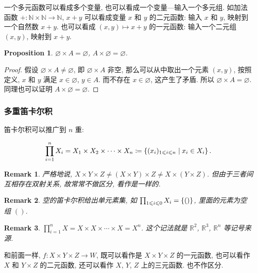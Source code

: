 \documentclass[UTF8]{ctexart}
\theoremstyle{mystyle}
\newtheorem{proposition}{Proposition}[section]
\theoremstyle{myremark}
\newtheorem*{remark}{Remark}
\theoremstyle{plain}
\newcommand{\R}{\mathbb R}
\newcommand{\N}{\mathbb N}
\DeclarePairedDelimiter\set{\{}{\}}
\begin{document}
一个多元函数可以看成多个变量, 也可以看成一个变量---输入一个多元组. 如加法函数 $ + \colon \N \times \N \to \N $, $ x + y $ 可以看成变量 $ x $ 和 $ y $ 的二元函数: 输入 $ x $ 和 $ y $, 映射到一个自然数 $ x + y $. 也可以看成 $ (x, y) \mapsto x + y $ 的一元函数: 输入一个二元组 $ (x, y) $, 映射到 $ x + y $.

\begin{proposition}
    $ \varnothing \times A = \varnothing $, $ A \times \varnothing = \varnothing $.
\end{proposition}

\begin{proof}
    假设 $ \varnothing \times A \neq \varnothing $, 即 $ \varnothing \times A $ 非空, 那么可以从中取出一个元素 $ (x, y) $, 按照定义, $ x $ 和 $ y $ 满足 $ x \in \varnothing $, $ y \in A $. 而不存在 $ x \in \varnothing $, 这产生了矛盾. 所以 $ \varnothing \times A = \varnothing $. 同理也可以证明 $ A \times \varnothing = \varnothing $.
\end{proof}


\subsubsection{多重笛卡尔积}
笛卡尔积可以推广到 $ n $ 重:
\begin{definition}
    \[ \prod_{i = 1}^n X_i = X_1 \times X_2 \times \cdots \times X_n \coloneqq \set{(x_i)_{1 \leqslant i \leqslant n} \mid x_i \in X_i } \,.\]
\end{definition}

\begin{remark}
    严格地说, $ X \times Y \times Z \neq (X \times Y) \times Z \neq X \times (Y \times Z) $. 但由于三者间互相存在双射关系, 故常常不做区分, 看作是一样的.
\end{remark}

\begin{remark}
    空的笛卡尔积给出单元素集, 如 $ \prod_{1 \leqslant i \leqslant 0} X_i = \set{()} $, 里面的元素为空组 $ () $. 
\end{remark}

\begin{remark}
    $ \prod_{i = 1}^n X = X \times X \times \cdots \times X = X^n $. 这个记法就是 $ \R^2 $, $ \R^3 $, $ \R^n $ 等记号来源.
\end{remark}

和前面一样, $ f \colon X \times Y \times Z \to W $, 既可以看作是 $ X \times Y \times Z $ 的一元函数, 也可以看作 $ X $ 和 $ Y \times Z $ 的二元函数, 还可以看作 $ X $, $ Y $, $ Z $ 上的三元函数. 也不作区分.
\end{document}

